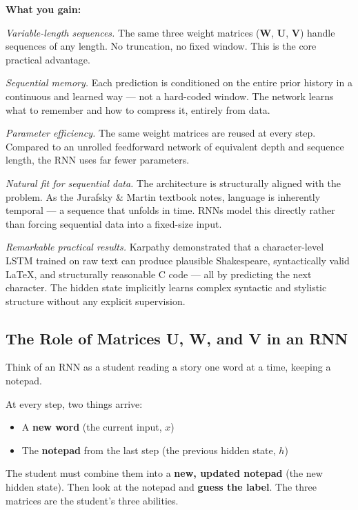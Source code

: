 \documentclass[12pt,a4paper]{article}
\begin{document}
\bigskip
\noindent\textbf{What you gain:}

\medskip
\noindent\textit{Variable-length sequences.}
The same three weight matrices ($\mathbf{W}$, $\mathbf{U}$, $\mathbf{V}$) handle
sequences of any length. No truncation, no fixed window. This is the core practical
advantage.

\medskip
\noindent\textit{Sequential memory.}
Each prediction is conditioned on the entire prior history in a continuous and learned
way --- not a hard-coded window. The network learns what to remember and how to compress
it, entirely from data.

\medskip
\noindent\textit{Parameter efficiency.}
The same weight matrices are reused at every step. Compared to an unrolled feedforward
network of equivalent depth and sequence length, the RNN uses far fewer parameters.

\medskip
\noindent\textit{Natural fit for sequential data.}
The architecture is structurally aligned with the problem. As the Jurafsky \& Martin
textbook notes, language is inherently temporal --- a sequence that unfolds in time.
RNNs model this directly rather than forcing sequential data into a fixed-size input.

\medskip
\noindent\textit{Remarkable practical results.}
Karpathy demonstrated that a character-level LSTM trained on raw text can produce
plausible Shakespeare, syntactically valid \LaTeX, and structurally reasonable C code
--- all by predicting the next character. The hidden state implicitly learns complex
syntactic and stylistic structure without any explicit supervision.

\subsection{The Role of Matrices U, W, and V in an RNN}

Think of an RNN as a student reading a story one word at a time, keeping a notepad.

At every step, two things arrive:
\begin{itemize}
    \item A \textbf{new word} (the current input, $x$)
    \item The \textbf{notepad} from the last step (the previous hidden state, $h$)
\end{itemize}

The student must combine them into a \textbf{new, updated notepad} (the new hidden state). Then look at the notepad and \textbf{guess the label}. The three matrices are the student's three abilities.
\end{document}
